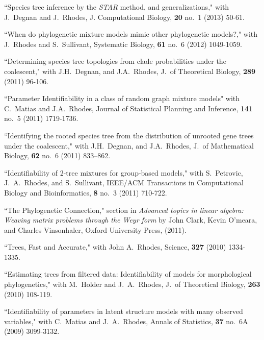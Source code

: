 \documentclass[10pt]{report}
\begin{document}
{{\begin{revnumerate}[44]
\item
``Species tree inference by the \emph{STAR} method, and generalizations,"
with J.~Degnan and J.~Rhodes, J. Computational Biology, {\bf 20} no.~1 (2013) 50-61.

\item
``When do phylogenetic mixture models mimic other phylogenetic models?," 
with J.~Rhodes and S.~Sullivant,
Systematic Biology, {\bf 61} no.~6 (2012) 1049-1059.

\item 
``Determining species tree topologies from clade probabilities under the coalescent,"
with J.H.~Degnan, and J.A.~Rhodes,
J.~of Theoretical Biology, {\bf 289} (2011) 96-106.

\item 
``Parameter Identifiability in a class of random graph mixture models"
with C.~Matias and J.A.~Rhodes,
Journal of Statistical Planning and Inference, {\bf 141} no.~5 (2011) 1719-1736.

\item
``Identifying the rooted species tree from the distribution of unrooted gene trees under the coalescent,"
with J.H.~Degnan, and J.A.~Rhodes,
J.~of Mathematical Biology, {\bf 62} no.~6 (2011) 833--862.

\item
``Identifiability of 2-tree mixtures for group-based models,"
with  S.~Petrovic, J.~A.~Rhodes, and S.~Sullivant,
IEEE/ACM Transactions in Computational Biology and Bioinformatics, 
{\bf 8} no.~3 (2011) 710-722.

\item 
``The Phylogenetic Connection," section
in \emph{Advanced topics in linear algebra: {W}eaving matrix problems through the Weyr form} 
by John Clark, Kevin O'meara, and Charles Vinsonhaler,
Oxford University Press, (2011).

\item 
``Trees, Fast and Accurate,"
with John A.~Rhodes,
Science, {\bf 327} (2010) 1334-1335.

\item 
``Estimating trees from filtered data: Identifiability of models
for morphological phylogenetics,"
with M.~Holder and J.~A.~Rhodes,
J.~of Theoretical Biology, {\bf 263} (2010) 108-119.

\item
``Identifiability of parameters in latent structure models with many observed variables,"
with C.~Matias and J.~A.~Rhodes,  
Annals of Statistics, {\bf 37} no.~6A (2009) 3099-3132.


\end{revnumerate}}}
\end{document}
